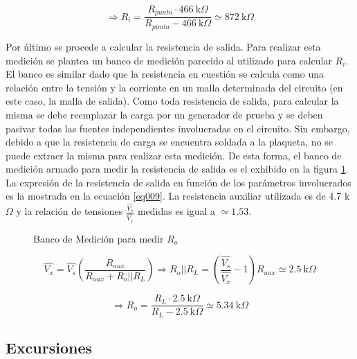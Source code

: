 \documentclass[a4paper,10pt]{article}
\begin{document}
				\begin{displaymath}
					\Rightarrow R_i = \frac{R_{punta} \cdot 466~\text{k}\Omega}{R_{punta} - 466~\text{k}\Omega}	\simeq 872~\text{k}\Omega
				\end{displaymath} 
		
				Por último se procede a calcular la resistencia de salida. Para realizar esta medición se plantea un banco de medición parecido al utilizado
				para calcular $R_i$. El banco es similar dado que la resistencia en cuestión se calcula como una relación entre la tensión y la corriente
				en un malla determinada del circuito (en este caso, la malla de salida). Como toda resistencia de salida, para calcular la misma se debe 
				reemplazar la carga por un generador de prueba y se deben pasivar todas las fuentes independientes involucradas en el circuito. Sin embargo, 
				debido a que la resistencia de carga se encuentra soldada a la plaqueta, no se puede extraer la misma para realizar esta medición. De esta
				forma, el banco de medición armado para medir la resistencia de salida es el exhibido en la figura \ref{circ005}. La expresión de la 
				resistencia de salida en función de los parámetros involucrados es la mostrada en la ecuación \ref{eq009}. La resistencia auxiliar utilizada
				es de 4.7 k$\Omega$ y la relación de tensiones $\frac{\hat{V_{s}}}{\hat{V_{x}}}$ medidas es igual a $\simeq 1.53$.   
					 
				\begin{figure}[!htp]
					\centering
			 		
	   			\caption{Banco de Medición para medir $R_o$} \label{circ005} 
		 		\end{figure}

				\begin{equation}
					\label{eq009}
					\hat{V_{x}} = \hat{V_{s}} \left( \frac{R_{aux}}{R_{aux} + R_{o}||R_{L}}\right) \Rightarrow R_{o}||R_{L} = 
					\left(\frac{\hat{V_s}}{\hat{V_x}} -1\right) R_{aux} \simeq 2.5~\text{k}\Omega 
				\end{equation}

				\begin{displaymath}
					\Rightarrow R_o = \frac{R_L \cdot 2.5~\text{k}\Omega}{{R_{L}} - 2.5~\text{k}\Omega}	\simeq 5.34~\text{k}\Omega
				\end{displaymath} 

		\subsection{Excursiones} \label{sec001}
\end{document}
